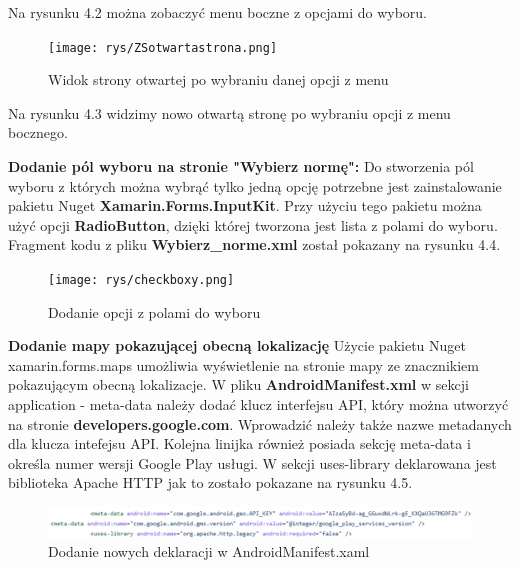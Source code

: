 Na rysunku 4.2 można zobaczyć menu boczne z opcjami do wyboru.


\begin{figure}[!htb]
	\begin{center}
		\texttt{[image: rys/ZSotwartastrona.png]}
		\caption{Widok strony otwartej po wybraniu danej opcji z menu}
		\label{rys:rysunek014}
	\end{center}
\end{figure}

Na rysunku 4.3 widzimy nowo otwartą stronę po wybraniu opcji z menu bocznego.

 \textbf{Dodanie pól wyboru na stronie "Wybierz normę":} \newline
 Do stworzenia pól wyboru z których można wybrąć tylko jedną opcję potrzebne jest zainstalowanie pakietu Nuget \textbf{Xamarin.Forms.InputKit}. Przy użyciu tego pakietu można użyć opcji \textbf{RadioButton}, dzięki której tworzona jest lista z polami do wyboru. \newline \newline
 Fragment kodu z pliku \textbf{Wybierz\_norme.xml} został pokazany na rysunku 4.4. \newline
 \begin{figure}[!htb]
 	\begin{center}
 		\texttt{[image: rys/checkboxy.png]}
 		\caption{Dodanie opcji z polami do wyboru}
 		\label{rys:rysunek015}
 	\end{center}
 \end{figure}
 

 \textbf{Dodanie mapy pokazującej obecną lokalizację}
 \newline
 Użycie pakietu Nuget xamarin.forms.maps umożliwia wyświetlenie na stronie mapy ze znacznikiem pokazującym obecną lokalizacje.
 \newline 
 W pliku \textbf{AndroidManifest.xml} w sekcji application - meta-data należy dodać klucz interfejsu API, który można utworzyć na stronie \textbf{developers.google.com}. Wprowadzić należy także nazwe metadanych dla klucza intefejsu API.
 Kolejna linijka również posiada sekcję meta-data i określa numer wersji Google Play usługi. W sekcji uses-library deklarowana jest biblioteka Apache HTTP jak to zostało pokazane na rysunku 4.5.

 \begin{figure}[!htb]
 	\begin{center}
 		\includegraphics[width=15cm]{rys/map_manifest.png}
 		\caption{Dodanie nowych deklaracji w AndroidManifest.xaml}
 		\label{rys:rysunek016}
 	\end{center}
 \end{figure}
 
